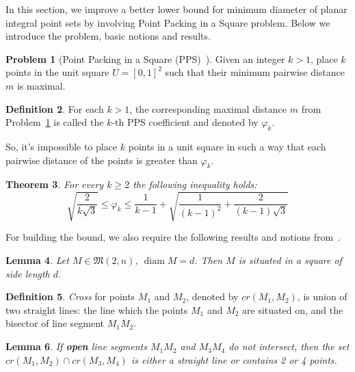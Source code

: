 \documentclass[a4paper,14pt]{article} %
\theoremstyle{plain}
\newtheorem{theorem}{Theorem}[section]
\newtheorem{lemma}[theorem]{Lemma}
\theoremstyle{definition}
\newtheorem{definition}[theorem]{Definition}
\newtheorem{problem}[theorem]{Problem}
\begin{document}
In this section,
we improve a better lower bound for minimum diameter of planar integral point sets by
involving Point Packing in a Square problem.
Below we introduce the problem, basic notions and results.

\begin{problem}[Point Packing in a Square (PPS)~\cite{locatelli2002packing,costa2013valid}]
	\label{problem:PPS}
	Given an integer $k > 1$, place $k$ points in the unit square $U = [ 0 , 1 ]^2$ such that their
	minimum pairwise distance $m$ is maximal.
\end{problem}

\begin{definition}
	For each $k > 1$, the corresponding maximal distance $m$ from Problem~\ref{problem:PPS}
	is called the $k$-th PPS coefficient and denoted by $\varphi_k$.
\end{definition}
So, it's impossible to place $k$ points in a unit square in such a way that each pairwise distance of the points is greater than $\varphi_k$.


\begin{theorem}
	\label{thm:varphi_k_bounds}
	\cite{costa2013valid}
	For every $k\geq 2$ the following inequality holds:
	\begin{equation*}
		\sqrt{\frac{2}{k\sqrt{3}}}
		\leq
		\varphi_k
		\leq
		\frac{1}{k-1} +
		\sqrt{
			\frac{1}{(k-1)^2}
			+
			\frac{2}{(k-1)\sqrt{3}}
		}
	\end{equation*}
\end{theorem}


For building the bound, we also require the following results and notions from~\cite{our-vmmsh-2018}.

\begin{lemma}
	\cite[Lemma 4]{our-vmmsh-2018}
	\label{lem:square_container}
	Let $M\in\mathfrak{M}(2,n)$, $\operatorname{diam} M = d$.
	Then $M$ is situated in a square of side length $d$.
\end{lemma}

\begin{definition}
	\textit{Cross} for points $M_1$ and $M_2$, denoted by $cr(M_1,M_2)$, is union of two straight lines:
	the line which the points $M_1$ and $M_2$ are situated on,
	and the bisector of line segment $M_1 M_2$.
\end{definition}

\begin{lemma}
	\label{lem:intervals_cross}
	If \textbf{open} line segments $M_1 M_2$ and $M_3 M_4$ do not intersect,
	then the set $cr(M_1,M_2) \cap cr(M_3,M_4)$ is either a straight line or contains 2 or 4 points.
\end{lemma}
\end{document}
